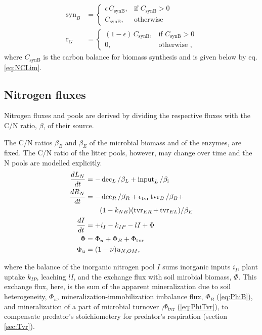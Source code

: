 \begin{subequations}
\label{eq:synB}
\begin{align}
\operatorname{syn}_B &= \begin{cases}
  \epsilon \, C_{\operatorname{synB}},  & \text{if~} C_{\operatorname{synB}} >
  0\\
  C_{\operatorname{synB}}, & \text{otherwise}
\end{cases} \\  
\operatorname{r}_G &= \begin{cases}
  (1 - \epsilon) \, C_{\operatorname{synB}},  & \text{if~}
  C_{\operatorname{synB}} > 0\\
  0, & \text{otherwise ,}
\end{cases}  
\end{align}
\end{subequations}
where $C_{\operatorname{synB}}$ is the carbon balance for biomass
synthesis and is given below by eq.
\ref{eq:NCLim}.



\subsection{Nitrogen fluxes}
Nitrogen fluxes and pools are derived by dividing the respective fluxes with the
C/N ratio, $\beta$, of their source.

The C/N ratios $\beta_B$ and $\beta_E$ of the microbial biomass and of the
enzymes, are fixed. The C/N ratio of the litter pools, however, may change over
time and the N pools are modelled explicitly.
\begin{subequations}
\label{eq:SEAMN}
\begin{align}
\frac{dL_N}{dt} &=  - \operatorname{dec}_L /\beta_{L} +
\operatorname{input}_L/\beta_{\operatorname{i}} 
\\
\frac{dR_N}{dt} &=  - \operatorname{dec}_R /\beta_{R} +
\epsilon_{\operatorname{tvr}} \operatorname{tvr}_B /\beta_{B} + \notag 
\\
& \qquad (1 -k_{NB}) (\operatorname{tvr}_{ER} +
\operatorname{tvr}_{EL})/\beta_{E} 
\\
\frac{dI}{dt} &= +i_I -k_{IP} -l I +\Phi
\\
\Phi &= \Phi_u +\Phi_B + \Phi_{\operatorname{tvr}}
\\
\Phi_u &= (1 -\nu) u_{N,OM}
\text{,} 
\end{align}
\end{subequations}

\noindent where the balance of the inorganic nitrogen pool $I$ sums inorganic
inputs $i_I$, plant uptake $k_{IP}$, leaching $l I$, and the exchange flux with
soil mirobial biomass, $\Phi$. This exchange flux, here, is the sum of the
apparent mineralization due to soil heterogeneity, $\Phi_u$,
mineralization-immobilization imbalance flux, $\Phi_B$ (\ref{eq:PhiB}), and
mineralization of a part of microbial turnover ,$\Phi_{\operatorname{tvr}}$
(\ref{eq:PhiTvr}), to compensate predator's stoichiometery for predator's
respiration (section \ref{sec:Tvr}).

